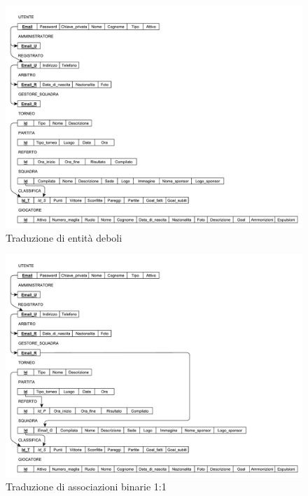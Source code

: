 	\begin{figure}[h]
		\centering
		\includegraphics[width=1\textwidth]
		{immagini/traduzione-entita-deboli}
		
		\caption{Traduzione di entità deboli}
	\end{figure}
	
	\begin{figure}[h]
		\centering
		\includegraphics[width=1\textwidth]
		{immagini/traduzione-associazioni-1-1}
		
		\caption{Traduzione di associazioni binarie 1:1}
	\end{figure}
	
